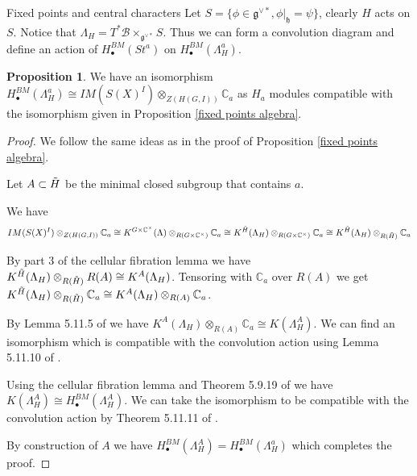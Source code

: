 \documentclass[12pt]{article}
\newcommand{\B}{\mathcal{B}}
\newcommand{\C}{\mathbb{C}}
\newcommand{\<}{\langle}
\renewcommand{\>}{\rangle}
\theoremstyle{plain}
\theoremstyle{definition}
\newtheorem{prop}[theorem]{Proposition}
\begin{document}
\begin{section}{Fixed points and central characters}
Let $S=\{\phi\in \mathfrak{g}^{\vee*},\phi|_\mathfrak{h}=\psi\}$, clearly $H$ acts on $S$. Notice that $\Lambda_H=T^*\B\times_{\mathfrak{g}^{\vee*}}S$. Thus we can form a convolution diagram and define an action of $H^{BM}_\bullet(St^a)$ on $H^{BM}_\bullet(\Lambda_H^a)$. 


\begin{prop}\label{fixed points module}
    We have an isomorphism $H^{BM}_\bullet(\Lambda_H^a)\cong IM(S(X)^I)\otimes_{Z(H(G,I))} \C_a$ as $H_a$ modules compatible with the isomorphism given in Proposition \ref{fixed points algebra}.
\end{prop}

\begin{proof}
    We follow the same ideas as in the proof of Proposition \ref{fixed points algebra}. 

    Let $A\subset \Tilde{H}$ be the minimal closed subgroup that contains $a$. 
    
    We have   $$IM(S(X)^I)\otimes_{Z(H(G,I))} \C_a\cong K^{G\times \C^\times}(\Lambda)\otimes_{R(G\times \C^\times)} \C_a\cong K^{\Tilde{H}}(\Lambda_H)\otimes_{R(G\times \C^\times)} \C_a\cong K^{\Tilde{H}}(\Lambda_H)\otimes_{R(\Tilde{H})} \C_a$$ 
    
    By part 3 of the cellular fibration lemma we have $K^{\Tilde{H}}(\Lambda_H)\otimes_{R(\Tilde{H})}R(A)\cong K^A(\Lambda_H)$. Tensoring with $\C_a$ over $R(A)$ we get $K^{\Tilde{H}}(\Lambda_H)\otimes_{R(\Tilde{H})} \C_a\cong K^A(\Lambda_H)\otimes_{R(A)}\C_a$.

    By Lemma 5.11.5 of \cite{Chriss1997RepresentationTA} we have $K^A(\Lambda_H)\otimes_{R(A)}\C_a\cong K(\Lambda_H^A)$. We can find an isomorphism which is compatible with the convolution action using Lemma 5.11.10 of \cite{Chriss1997RepresentationTA}.
    
    
    Using the cellular fibration lemma and Theorem 5.9.19 of \cite{Chriss1997RepresentationTA} we have $K(\Lambda_H^A)\cong H_\bullet^{BM}(\Lambda_H^A)$. We can take the isomorphism to be compatible with the convolution action by Theorem 5.11.11 of \cite{Chriss1997RepresentationTA}.

    By construction of $A$ we have $H_\bullet^{BM}(\Lambda_H^A)=H_\bullet^{BM}(\Lambda_H^a)$ which completes the proof. 
\end{proof}




\end{section}
\end{document}
